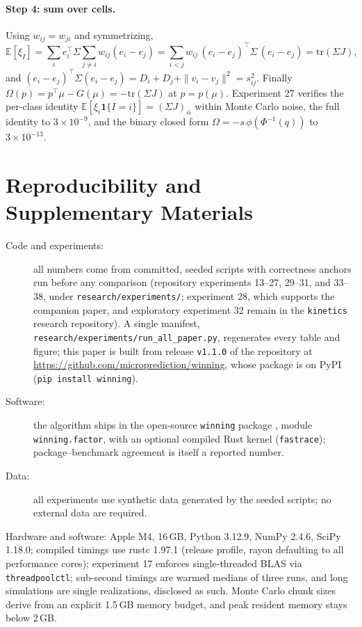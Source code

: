 \documentclass[12pt]{article}
\theoremstyle{remark}
\newcommand{\E}{\mathbb{E}}
\begin{document}
\paragraph{Step 4: sum over cells.} Using $w_{ij} = w_{ji}$ and
symmetrizing,
\[
\E[\xi_I] = \sum_i e_i^\top \Sigma \sum_{j\ne i} w_{ij}(e_i - e_j)
= \sum_{i<j} w_{ij}\, (e_i - e_j)^\top \Sigma\, (e_i - e_j)
= \mathrm{tr}(\Sigma J),
\]
and $(e_i - e_j)^\top \Sigma (e_i - e_j) = D_i + D_j + \|v_i -
v_j\|^2 = s_{ij}^2$. Finally $\Omega(p) = p^\top \mu - G(\mu) =
-\mathrm{tr}(\Sigma J)$ at $p = p(\mu)$. Experiment 27 verifies the
per-class identity $\E[\xi_i \mathbf{1}\{I=i\}] = (\Sigma J)_{ii}$
within Monte Carlo noise, the full identity to $3\times10^{-9}$, and
the binary closed form $\Omega = -s\,\phi(\Phi^{-1}(q))$ to
$3\times10^{-13}$.

\section*{Reproducibility and Supplementary Materials}
\sloppy

\begin{description}
\item[Code and experiments:] all numbers come from committed, seeded
scripts with correctness anchors run before any comparison (repository
experiments 13--27, 29--31, and 33--38, under
\texttt{research/experiments/}; experiment 28, which supports the
companion paper, and exploratory experiment 32 remain in the
\texttt{kinetics} research repository). A single manifest,
\texttt{research/experiments/run\_all\_paper.py}, regenerates every
table and figure; this paper is built from release \texttt{v1.1.0}
of the repository at \url{https://github.com/microprediction/winning},
whose package is on PyPI (\texttt{pip install winning}).
\item[Software:] the algorithm ships in the open-source
\texttt{winning} package \citep{winningpkg}, module
\texttt{winning.factor}, with an optional compiled Rust kernel
(\texttt{fastrace}); package--benchmark agreement is itself a reported
number.
\item[Data:] all experiments use synthetic data generated by the seeded
scripts; no external data are required.
\end{description}

Hardware and software: Apple M4, 16\,GB, Python 3.12.9,
NumPy 2.4.6, SciPy 1.18.0; compiled timings use rustc 1.97.1
(release profile, rayon defaulting to all performance cores); experiment 17 enforces single-threaded BLAS via
\texttt{threadpoolctl}; sub-second timings are warmed medians of three
runs, and long simulations are single realizations, disclosed as such.
Monte Carlo chunk sizes derive from an explicit 1.5\,GB memory budget, and
peak resident memory stays below 2\,GB.
\end{document}
